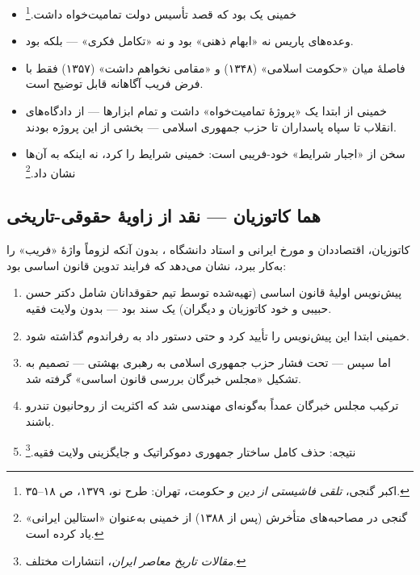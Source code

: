 
\begin{warningBox}
\begin{itemize}[label=\textcolor{cAccent}{$\bullet$}, rightmargin=2em]
    \item خمینی یک  بود که قصد تأسیس دولت تمامیت‌خواه داشت.\footnote{اکبر گنجی، \textit{تلقی فاشیستی از دین و حکومت}، تهران: طرح نو، ۱۳۷۹، ص ۱۸–۳۵.}
    \item وعده‌های پاریس نه «ابهام ذهنی» بود و نه «تکامل فکری» — بلکه  بود.
    \item فاصلهٔ میان «حکومت اسلامی» (۱۳۴۸) و «مقامی نخواهم داشت» (۱۳۵۷) فقط با فرض فریب آگاهانه قابل توضیح است.
    \item خمینی از ابتدا یک «پروژهٔ تمامیت‌خواه» داشت و تمام ابزارها — از دادگاه‌های انقلاب تا سپاه پاسداران تا حزب جمهوری اسلامی — بخشی از این پروژه بودند.
    \item سخن از «اجبار شرایط» خود-فریبی است: خمینی شرایط را  کرد، نه اینکه به آن‌ها  نشان داد.\footnote{گنجی در مصاحبه‌های متأخرش (پس از ۱۳۸۸) از خمینی به‌عنوان «استالین ایرانی» یاد کرده است.}
\end{itemize}
\end{warningBox}

\subsection{هما کاتوزیان — نقد از زاویهٔ حقوقی-تاریخی}

کاتوزیان، اقتصاددان و مورخ ایرانی و استاد دانشگاه ، بدون آنکه لزوماً واژهٔ «فریب» را به‌کار ببرد، نشان می‌دهد که فرایند تدوین قانون اساسی  بود:

\begin{noteBox}
\begin{enumerate}[label=\textcolor{cGold}{\bfseries\arabic*.}, rightmargin=2em]
    \item پیش‌نویس اولیهٔ قانون اساسی (تهیه‌شده توسط تیم حقوقدانان شامل دکتر حسن حبیبی و خود کاتوزیان و دیگران) یک سند  بود — بدون ولایت فقیه.
    \item خمینی ابتدا این پیش‌نویس را تأیید کرد و حتی دستور داد به رفراندوم گذاشته شود.
    \item اما سپس — تحت فشار حزب جمهوری اسلامی به رهبری بهشتی — تصمیم به تشکیل «مجلس خبرگان بررسی قانون اساسی» گرفته شد.
    \item ترکیب مجلس خبرگان عمداً به‌گونه‌ای مهندسی شد که اکثریت از روحانیون تندرو باشند.
    \item نتیجه: حذف کامل ساختار جمهوری دموکراتیک و جایگزینی ولایت فقیه.\footnote{ \textit{مقالات تاریخ معاصر ایران}، انتشارات مختلف.}
\end{enumerate}
\end{noteBox}

